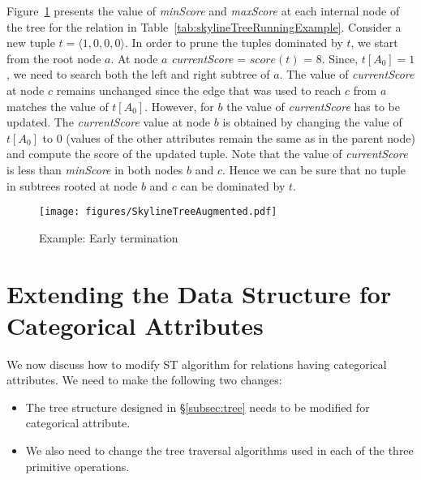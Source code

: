 Figure~\ref{fig:treeAugmented} presents the value of \textit{minScore} and \textit{maxScore} at each internal node of the tree for the relation in Table~\ref{tab:skylineTreeRunningExample}. Consider a new tuple $t = \langle 1,0,0,0 \rangle$. In order to prune the tuples dominated by $t$, we start from the root node $a$. At node $a$ \textit{currentScore} = $score(t)$ = 8. Since, $t[A_0] = 1$, we need to search both the left and right subtree of $a$. The value of \textit{currentScore} at node $c$ remains unchanged since the edge that was used to reach $c$ from $a$ matches the value of $t[A_0]$. However, for $b$  the value of \textit{currentScore} has to be updated. The \textit{currentScore} value at node $b$ is obtained by changing the value of $t[A_0]$ to 0 (values of the other attributes remain
the same as in the parent node) and compute the score of the updated tuple. Note that the value of \textit{currentScore} is less than \textit{minScore} in both nodes $b$ and $c$. Hence we can be sure that no tuple in subtrees rooted at node $b$ and $c$ can be dominated by $t$.

\begin{figure}[!h]
  \centering
  \texttt{[image: figures/SkylineTreeAugmented.pdf]}
  \vspace{-6mm}\caption{Example: Early termination}
  \label{fig:treeAugmented}
\end{figure}


\section{Extending the Data Structure for Categorical Attributes}\label{ap:STCategorical}
We now discuss how to modify ST algorithm for relations having categorical attributes. We need to make the following two changes:

\begin{itemize}
    \item The tree structure designed in \S\ref{subsec:tree} needs to be modified for categorical attribute.
    \item We also need to change the tree traversal algorithms used in each of the three primitive operations.
\end{itemize}

